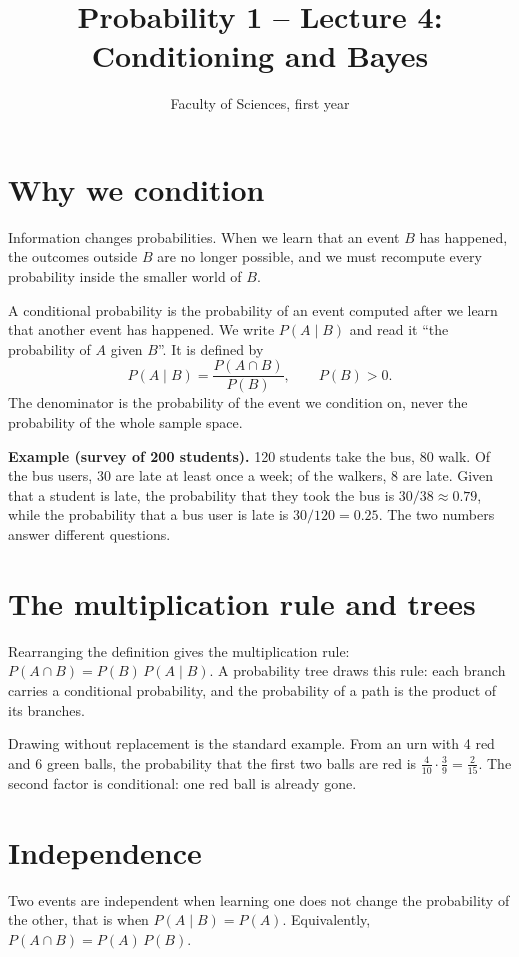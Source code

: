 \documentclass[11pt,a4paper]{article}
\title{Probability 1 -- Lecture 4: Conditioning and Bayes}
\author{Faculty of Sciences, first year}
\date{}
\begin{document}
\maketitle

\section{Why we condition}

Information changes probabilities. When we learn that an event $B$ has happened, the outcomes outside $B$ are no longer possible, and we must recompute every probability inside the smaller world of $B$.

A conditional probability is the probability of an event computed after we learn that another event has happened. We write $P(A \mid B)$ and read it ``the probability of $A$ given $B$''. It is defined by
\[ P(A \mid B) = \frac{P(A \cap B)}{P(B)}, \qquad P(B) > 0. \]
The denominator is the probability of the event we condition on, never the probability of the whole sample space.

\textbf{Example (survey of 200 students).} 120 students take the bus, 80 walk. Of the bus users, 30 are late at least once a week; of the walkers, 8 are late. Given that a student is late, the probability that they took the bus is $30/38 \approx 0.79$, while the probability that a bus user is late is $30/120 = 0.25$. The two numbers answer different questions.

\section{The multiplication rule and trees}

Rearranging the definition gives the multiplication rule: $P(A \cap B) = P(B)\,P(A \mid B)$. A probability tree draws this rule: each branch carries a conditional probability, and the probability of a path is the product of its branches.

Drawing without replacement is the standard example. From an urn with 4 red and 6 green balls, the probability that the first two balls are red is $\frac{4}{10}\cdot\frac{3}{9} = \frac{2}{15}$. The second factor is conditional: one red ball is already gone.

\section{Independence}

Two events are independent when learning one does not change the probability of the other, that is when $P(A \mid B) = P(A)$. Equivalently, $P(A \cap B) = P(A)\,P(B)$.
\end{document}
